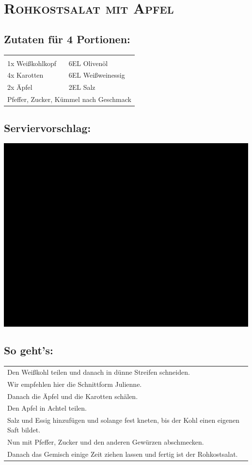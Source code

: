 \section{\textsc{Rohkostsalat mit Apfel}}

\subsection*{Zutaten für 4 Portionen:}

\begin{tabular}{p{7.5cm} p{7.5cm}}
	& \\
	1x Weißkohlkopf & 6EL Olivenöl \\
	4x Karotten & 6EL Weißweinessig \\
	2x Äpfel & 2EL Salz \\
	\multicolumn{2}{l}{Pfeffer, Zucker, Kümmel nach Geschmack}
\end{tabular}

\subsection*{Serviervorschlag:}

\includegraphics[width=\textwidth]{img/ph.jpg}

\subsection*{So geht's:}
\begin{tabular}{p{15cm}}
	\\
	Den Weißkohl teilen und danach in dünne Streifen schneiden.\\
	Wir empfehlen hier die Schnittform Julienne.\\
	Danach die Äpfel und die Karotten schälen.\\
	Den Apfel in Achtel teilen.\\
	Salz und Essig hinzufügen und solange fest kneten, bis der Kohl einen eigenen Saft bildet.\\
	Nun mit Pfeffer, Zucker und den anderen Gewürzen abschmecken.\\
	Danach das Gemisch einige Zeit ziehen lassen und fertig ist der Rohkostsalat.
\end{tabular}